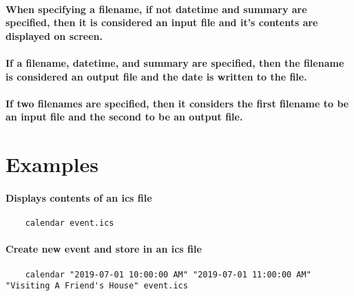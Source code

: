 \documentclass[11pt]{article}
\begin{document}
\paragraph{When specifying a filename, if not datetime and summary are specified, then it is considered an input file and it's contents are displayed on screen.}
\paragraph{If a filename, datetime, and summary are specified, then the filename is considered an output file and the date is written to the file.}
\paragraph{If two filenames are specified, then it considers the first filename to be an input file and the second to be an output file.}

\section{Examples}
\paragraph{Displays contents of an ics file}
\begin{verbatim}
    calendar event.ics
\end{verbatim}
\paragraph{Create new event and store in an ics file}
\begin{verbatim}
    calendar "2019-07-01 10:00:00 AM" "2019-07-01 11:00:00 AM" "Visiting A Friend's House" event.ics
\end{verbatim}
\end{document}
